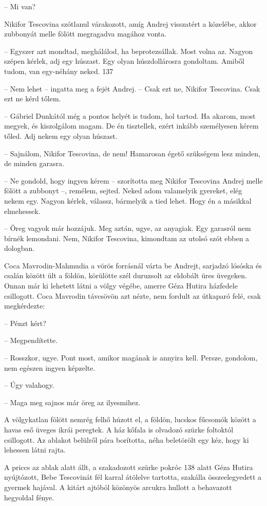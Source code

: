 \documentclass{IEEEtran}
\begin{document}
– Mi van?

Nikifor Tescovina szótlanul várakozott, amíg Andrej visszatért a közelébe,
akkor zubbonyát melle fölött megragadva magához vonta.

– Egyszer azt mondtad, meghálálod, ha beprotezsállak. Most volna az. Nagyon
szépen kérlek, adj egy húszast. Egy olyan húszdollárosra gondoltam. Amiből
tudom, van egy-néhány neked.
137

– Nem lehet – ingatta meg a fejét Andrej. – Csak ezt ne, Nikifor Tescovina.
Csak ezt ne kérd tőlem.

– Gábriel Dunkától még a pontos helyét is tudom, hol tartod. Ha akarom, most
megyek, és kiszolgálom magam. De én tisztellek, ezért inkább személyesen kérem
tőled. Adj nekem egy olyan húszast.

– Sajnálom, Nikifor Tescovina, de nem! Hamarosan égető szükségem lesz minden,
de minden garasra.

– Ne gondold, hogy ingyen kérem – szorította meg Nikifor Tescovina Andrej
melle fölött a zubbonyt –, remélem, sejted. Neked adom valamelyik gyereket,
elég nekem egy. Nagyon kérlek, válassz, bármelyik a tied lehet. Hogy én a
másikkal elmehessek.

– Öreg vagyok már hozzájuk. Meg aztán, ugye, az anyagiak. Egy garasról nem
bírnék lemondani. Nem, Nikifor Tescovina, kimondtam az utolsó szót ebben a
dologban.

Coca Mavrodin-Mahmudia a vörös forrásnál várta be Andrejt, sarjadzó lósóska és
csalán között ült a földön, körülötte szél duruzsolt az eldobált üres
üvegeken. Onnan már ki lehetett látni a völgy végébe, amerre Géza Hutira
házfedele csillogott. Coca Mavrodin távcsövön azt nézte, nem fordult az
útkaparó felé, csak megkérdezte:

– Pénzt kért?

– Megpendítette.

– Rosszkor, ugye. Pont most, amikor magának is annyira kell. Persze, gondolom,
nem egészen ingyen képzelte.

– Úgy valahogy.

– Maga meg sajnos már öreg az ilyesmihez.

A völgykatlan fölött nemrég felhő húzott el, a földön, lucskos fűcsomók között
a havas eső üveges ikrái peregtek. A ház kőfala is olvadozó szürke foltoktól
csillogott. Az ablakot belülről pára borította, néha beletörölt egy kéz, hogy
ki lehessen látni rajta.

A priccs az ablak alatt állt, a szakadozott szürke pokróc 138 alatt Géza Hutira
nyújtózott, Bebe Tescovinát fél karral átölelve tartotta, szakálla
összeelegyedett a gyermek hajával. A kitárt ajtóból közönyös arcukra hullott a
behavazott hegyoldal fénye.
\end{document}
